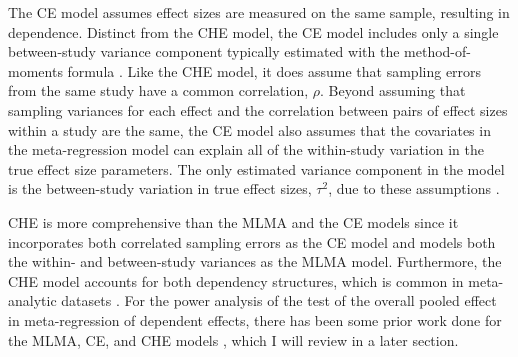 The CE model assumes effect sizes are measured on the same sample, resulting in dependence. Distinct from the CHE model, the CE model includes only a single between-study variance component typically estimated with the method-of-moments formula \autocite{hedges2010}. Like the CHE model, it does assume that sampling errors from the same study have a common correlation, $\rho$. 
Beyond assuming that sampling variances for each effect and the correlation between pairs of effect sizes within a study are the same, the CE model also assumes that the covariates in the meta-regression model can explain all of the within-study variation in the true effect size parameters. The only estimated variance component in the model is the between-study variation in true effect sizes, $\tau^2$, due to these assumptions \autocite{pustejovsky2022}. 

CHE is more comprehensive than the MLMA and the CE models since it incorporates both correlated sampling errors as the CE model and models both the within- and between-study variances as the MLMA model. Furthermore, the CHE model accounts for both dependency structures, which is common in meta-analytic datasets \autocite{pustejovsky2022}. For the power analysis of the test of the overall pooled effect in meta-regression of dependent effects, there has been some prior work done for the MLMA, CE, and CHE models \autocite{vembye2023, vembye2024, zhang2024}, which I will review in a later section.  







